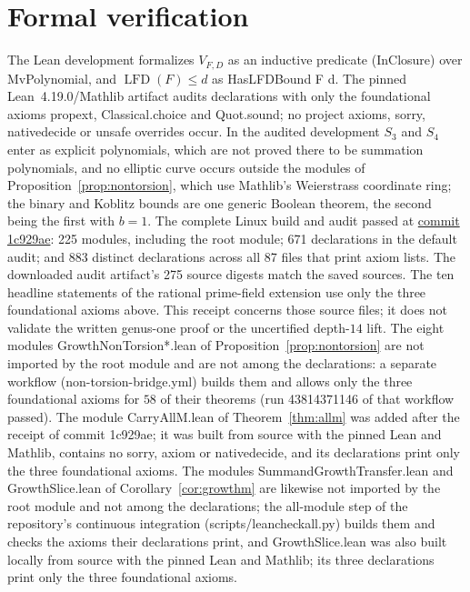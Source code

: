 \documentclass[11pt]{article}
\theoremstyle{definition}\newtheorem{definition}[theorem]{Definition}
\theoremstyle{remark}\newtheorem{remark}[theorem]{Remark}
\newcommand{\lfd}{\operatorname{LFD}}
\newcommand{\codeus}{\textunderscore\allowbreak}
\newcommand{\code}[1]{{\ttfamily\let\_\codeus#1}}
\begin{document}
\section{Formal verification}\label{app:lean}
The Lean development formalizes $V_{F,D}$ as an inductive predicate
(\code{InClosure}) over \code{MvPolynomial}, and $\lfd(F)\le d$ as
\code{HasLFDBound F d}. The pinned Lean~4.19.0/Mathlib artifact audits
\LEANDECLS{} declarations with only the foundational axioms \code{propext},
\code{Classical.choice} and \code{Quot.sound}; no project axioms,
\code{sorry}, \code{native\_decide} or unsafe overrides occur. In the audited development
$S_3$ and $S_4$ enter as explicit
polynomials, which are not proved there to be summation polynomials, and no
elliptic curve occurs outside the modules of
Proposition~\ref{prop:nontorsion}, which use Mathlib's Weierstrass
coordinate ring; the
binary and Koblitz bounds are one generic Boolean theorem, the second being
the first with $b=1$.
The complete Linux build and audit passed at
\href{https://github.com/isogeny-labs/lfd-summation-systems/actions/runs/43777495526}{commit \code{1c929ae}}:
225 modules, including the root module; 671 declarations in the default
audit; and 883 distinct declarations across all 87 files that print axiom
lists. The downloaded audit artifact's 275 source digests match the saved
sources. The ten headline statements of the rational prime-field extension
use only the three foundational axioms above. This receipt concerns those
source files; it does not validate the written genus-one proof or the
uncertified depth-$14$ lift. The eight modules
\code{GrowthNonTorsion*.lean} of Proposition~\ref{prop:nontorsion} are not
imported by the root module and are not among the \LEANDECLS{}
declarations: a separate workflow (\code{non-torsion-bridge.yml}) builds
them and allows only the three foundational axioms for $58$ of their
theorems (run 43814371146 of that workflow passed). The module
\code{CarryAllM.lean} of Theorem~\ref{thm:allm} was added after the
receipt of commit \code{1c929ae}; it was built from source with the pinned
Lean and Mathlib, contains no \code{sorry}, \code{axiom} or
\code{native\_decide}, and its declarations print only the three
foundational axioms. The modules \code{SummandGrowthTransfer.lean} and
\code{GrowthSlice.lean} of Corollary~\ref{cor:growthm} are likewise not
imported by the root module and not among the \LEANDECLS{} declarations;
the all-module step of the repository's continuous integration
(\code{scripts/lean\_check\_all.py}) builds them and checks the axioms
their declarations print, and \code{GrowthSlice.lean} was also built locally from source with the
pinned Lean and Mathlib; its three declarations print only the three
foundational axioms.
\end{document}
